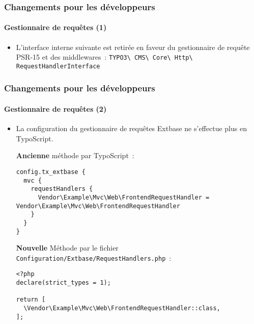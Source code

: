 
\begin{frame}[fragile]
	\frametitle{Changements pour les développeurs}
	\framesubtitle{Gestionnaire de requêtes (1)}

	\begin{itemize}
		\item L'interface interne suivante est retirée en faveur du gestionnaire de requête PSR-15
			et des middlewares~:\newline
			\texttt{TYPO3\textbackslash
				CMS\textbackslash
				Core\textbackslash
				Http\textbackslash
				RequestHandlerInterface}

	\end{itemize}

\end{frame}


\begin{frame}[fragile]
	\frametitle{Changements pour les développeurs}
	\framesubtitle{Gestionnaire de requêtes (2)}

	\lstset{basicstyle=\tiny\ttfamily}

	\begin{itemize}
		\item La configuration du gestionnaire de requêtes Extbase ne s'effectue plus en TypoScript.

		\smaller\textbf{Ancienne} méthode par TypoScript~:\normalsize
\begin{lstlisting}
config.tx_extbase {
  mvc {
    requestHandlers {
      Vendor\Example\Mvc\Web\FrontendRequestHandler = Vendor\Example\Mvc\Web\FrontendRequestHandler
    }
  }
}
\end{lstlisting}

		\smaller\textbf{Nouvelle} Méthode par le fichier \texttt{Configuration/Extbase/RequestHandlers.php}~:\normalsize
\begin{lstlisting}
<?php
declare(strict_types = 1);

return [
  \Vendor\Example\Mvc\Web\FrontendRequestHandler::class,
];
\end{lstlisting}

	\end{itemize}

\end{frame}


